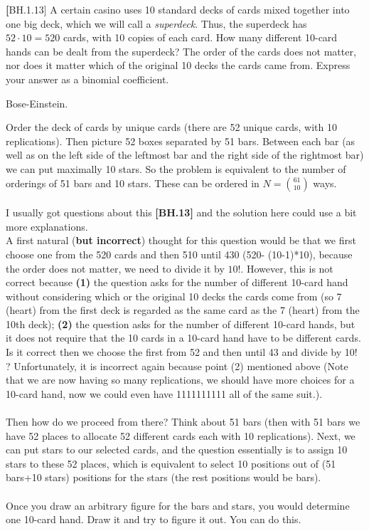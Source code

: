 
\setcounter{theorem}{9}
\begin{exercise}\textbf[BH.1.13]
	A certain casino uses 10 standard decks of cards mixed together into one big deck, which we will call a \emph{superdeck}. Thus, the superdeck has $52 \cdot 10 = 520$ cards, with 10 copies of each card. How many different 10-card hands can be dealt from the superdeck? The order of the cards does not matter, nor does it matter which of the original 10 decks the cards came from. Express your answer as a binomial coefficient.
\begin{hint}
	Bose-Einstein.	
\end{hint}
\begin{solution}
	Order the deck of cards by unique cards (there are 52 unique cards, with 10 replications). Then picture 52 boxes separated by 51 bars. Between each bar (as well as on the left side of the leftmost bar and the right side of the rightmost bar) we can put maximally 10 stars. So the problem is equivalent to the number of orderings of 51 bars and 10 stars. These can be ordered in $N={61 \choose 10}$ ways.\\~\\
	
	I usually got questions about this \textbf{[BH.13]} and the solution here could use a bit more explanations.\\ A first natural (\textbf{but incorrect}) thought for this question would be that we first choose one from the 520 cards and then 510 until 430 (520- (10-1)*10), because the order does not matter, we need to divide it by $10!$. However, this is not correct because \textbf{(1)} the question asks for the number of different 10-card hand without considering which or the original 10 decks the cards come from (so 7 (heart) from the first deck is regarded as the same card as the 7 (heart) from the 10th deck); \textbf{(2)} the question asks for the number of different 10-card hands, but it does not require that the 10 cards in a 10-card hand have to be different cards. Is it correct then we choose the first from 52 and then until 43 and divide by 10! ?  Unfortunately, it is incorrect again because point (2) mentioned above (Note that we are now having so many replications, we should have more choices for a 10-card hand, now we could even have 1111111111 all of the same suit.). \\~\\
	 Then how do we proceed from there? Think about 51 bars (then with 51 bars we have 52 places to allocate 52 different cards each with 10 replications). Next, we can put stars to our selected cards, and the question essentially is to assign 10 stars to these 52 places, which is equivalent to select 10 positions out of (51 bars+10 stars) positions for the stars (the rest positions would be bars).\\~\\ 
	 Once you draw an arbitrary figure for the bars and stars, you would determine one 10-card hand. Draw it and try to figure it out. You can do this.     
\end{solution}
\end{exercise}


